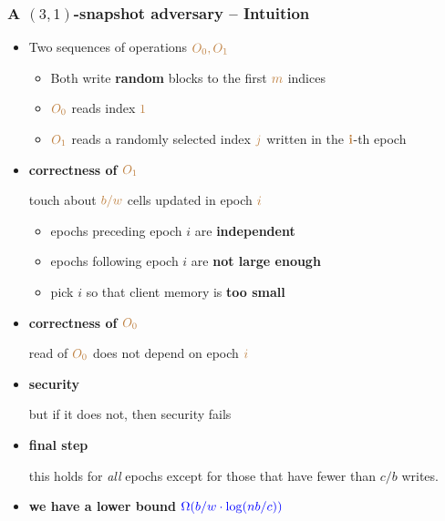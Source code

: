 \documentclass[]{beamer}
\begin{document}
\begin{frame}
\frametitle{A $(3,1)$-snapshot adversary -- Intuition}

\begin{itemize}[<+->]
\color{teal}
\item Two sequences of operations $\color{brown} O_0, O_1$
\begin{itemize}
    \color{teal}
    \item Both write {\bf random} blocks to the first $\color{brown} m$ 
        indices
    \item $\color{brown} O_0$ reads index $\color{brown}{1}$
    \item $\color{brown} O_1$ reads a randomly selected index 
            $\color{brown} j$
            written in the $\color{brown}\mathbf{i}$-th epoch
\end{itemize}
\item {\bf correctness of $\color{brown} {O_1}$} 

    touch about $\color{brown} b/w$ cells updated
        in epoch $\color{brown} i$
\begin{itemize}
        \color{teal}
    \item epochs preceding epoch $i$ are {\bf independent}
    \item epochs following epoch $i$ are {\bf not large enough}
    \item pick $i$ so that client memory is {\bf too small}
\end{itemize}
\item {\bf correctness of $\color{brown} {O_0}$} 

    read of $\color{brown} O_0$ does not depend on epoch $\color{brown} i$

\item {\bf security}

    but if it does not, then security fails

\item{\bf final step} 

    this holds for {\em all} epochs except for those that have fewer
    than $c/b$ writes.

\item \color{magenta}\bf we have a lower bound
$\color{blue}\Omega(b/w\cdot\log(nb/c))$
\end{itemize}


\end{frame}
\end{document}
